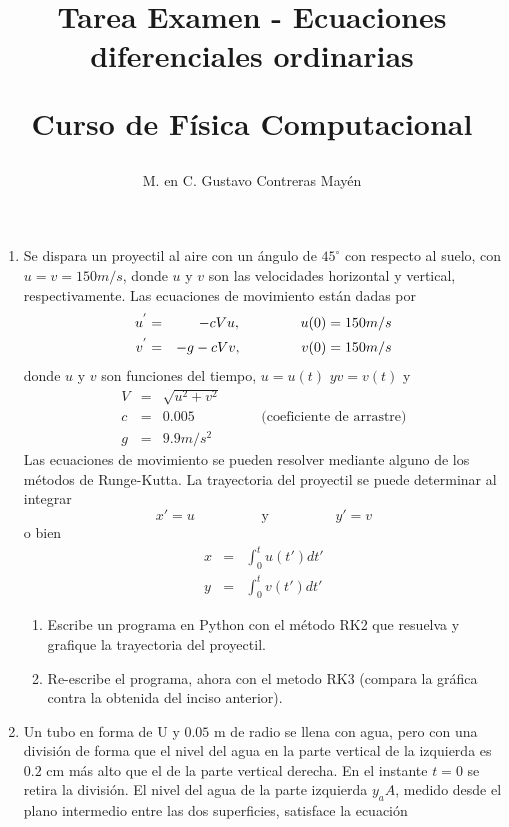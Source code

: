 \documentclass[letterpaper]{article}
\title{Tarea Examen - Ecuaciones diferenciales ordinarias \\ \begin{large}Curso de Física Computacional\end{large}}
\author{M. en C. Gustavo Contreras Mayén}
\date{ }
\begin{document}
\maketitle
\fontsize{14}{14}\selectfont
{}
\begin{enumerate}
\item Se dispara un proyectil al aire con un ángulo de $45^{\circ}$ con respecto al suelo, con $u=v=150 m/s$, donde $u$ y $v$ son las velocidades horizontal y vertical, respectivamente. Las ecuaciones de movimiento están dadas por
\begin{eqnarray*}
u^{'} & = & -c Vu, \hspace{1.5cm} u(0)=150 m/s \\
v^{'} & = & -g - cVv, \hspace{1.5cm} v(0)=150 m/s
\end{eqnarray*}
donde $u$ y $v$ son funciones del tiempo, $u=u(t)$ $y v=v(t)$ y
\begin{eqnarray*}
V & = & \sqrt{u^{2} + v^{2}} \\
c & = & 0.005 \hspace{2cm} \text{(coeficiente de arrastre)} \\
g & = & 9.9 m/s^{2}
\end{eqnarray*}
Las ecuaciones de movimiento se pueden resolver mediante alguno de los métodos de Runge-Kutta. La trayectoria del proyectil se puede determinar al integrar
\[ x' = u \hspace{2cm} \text{y} \hspace{2cm} y' = v \]
o bien
\begin{eqnarray*}
x & = & \int^{t}_{0} u(t') dt' \\
y & = & \int^{t}_{0} v(t') dt'
\end{eqnarray*}
\begin{enumerate}
\item Escribe un programa en Python con el método RK2 que resuelva y grafique la trayectoria del proyectil.
\item Re-escribe el programa, ahora con el metodo RK3 (compara la gr\'{a}fica contra la obtenida del inciso anterior).
\end{enumerate}
\item Un tubo en forma de U y $0.05$ m de radio se llena con agua, pero con una división de forma que el nivel del agua en la parte vertical de la izquierda es $0.2$ cm más alto que el de la parte vertical derecha. En el instante $t=0$ se retira la división. El nivel del agua de la parte izquierda $y_{a}A$, medido desde el plano intermedio entre las dos superficies, satisface la ecuación

\end{enumerate}
\end{document}
